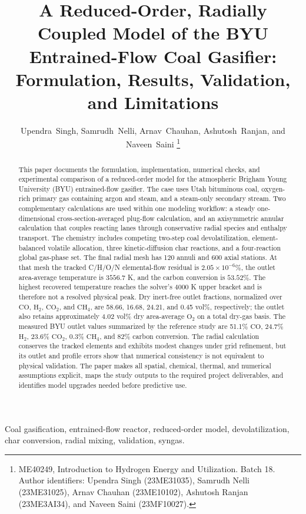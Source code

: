 \documentclass[journal]{IEEEtran}
\title{A Reduced-Order, Radially Coupled Model of the BYU Entrained-Flow Coal Gasifier: Formulation, Results, Validation, and Limitations}
\author{Upendra~Singh, Samrudh~Nelli, Arnav~Chauhan, Ashutosh~Ranjan, and Naveen~Saini%
\thanks{ME40249, Introduction to Hydrogen Energy and Utilization. Batch 18. Author identifiers: Upendra Singh (23ME31035), Samrudh Nelli (23ME31025), Arnav Chauhan (23ME10102), Ashutosh Ranjan (23ME3AI34), and Naveen Saini (23MF10027).}}
\newcommand{\CO}{\mathrm{CO}}
\newcommand{\COtwo}{\mathrm{CO_2}}
\newcommand{\Htwo}{\mathrm{H_2}}
\newcommand{\Otwo}{\mathrm{O_2}}
\newcommand{\CHfour}{\mathrm{CH_4}}
\begin{document}
\maketitle

\begin{abstract}
This paper documents the formulation, implementation, numerical checks, and experimental comparison of a reduced-order model for the atmospheric Brigham Young University (BYU) entrained-flow gasifier. The case uses Utah bituminous coal, oxygen-rich primary gas containing argon and steam, and a steam-only secondary stream. Two complementary calculations are used within one modeling workflow: a steady one-dimensional cross-section-averaged plug-flow calculation, and an axisymmetric annular calculation that couples reacting lanes through conservative radial species and enthalpy transport. The chemistry includes competing two-step coal devolatilization, element-balanced volatile allocation, three kinetic-diffusion char reactions, and a four-reaction global gas-phase set. The final radial mesh has 120 annuli and 600 axial stations. At that mesh the tracked C/H/O/N elemental-flow residual is \(2.05\times10^{-6}\%\), the outlet area-average temperature is \(3556.7\) K, and the carbon conversion is \(53.52\%\). The highest recovered temperature reaches the solver's \(4000\) K upper bracket and is therefore not a resolved physical peak. Dry inert-free outlet fractions, normalized over \(\CO\), \(\Htwo\), \(\COtwo\), and \(\CHfour\), are 58.66, 16.68, 24.21, and 0.45 vol\%, respectively; the outlet also retains approximately 4.02 vol\% dry area-average \(\Otwo\) on a total dry-gas basis. The measured BYU outlet values summarized by the reference study are 51.1\% \(\CO\), 24.7\% \(\Htwo\), 23.6\% \(\COtwo\), 0.3\% \(\CHfour\), and 82\% carbon conversion. The radial calculation conserves the tracked elements and exhibits modest changes under grid refinement, but its outlet and profile errors show that numerical consistency is not equivalent to physical validation. The paper makes all spatial, chemical, thermal, and numerical assumptions explicit, maps the study outputs to the required project deliverables, and identifies model upgrades needed before predictive use.
\end{abstract}

\begin{IEEEkeywords}
Coal gasification, entrained-flow reactor, reduced-order model, devolatilization, char conversion, radial mixing, validation, syngas.
\end{IEEEkeywords}
\end{document}

